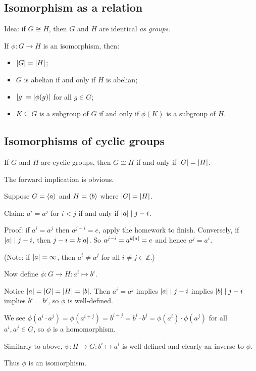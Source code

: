 \documentclass[12pt,letterpaper]{report}
\begin{document}
\pagebreak
\subsection{Isomorphism as a relation}

Idea: if $G \cong H$, then $G$ and $H$ are identical \emph{as groups}.

If $\phi \colon G \to H$ is an isomorphism, then:
\begin{itemize}
  \item $\lvert G\rvert = \lvert H\rvert$;
  \item $G$ is abelian if and only if $H$ is abelian;
  \item $\lvert g\rvert = \lvert\phi(g)\rvert$ for all $g \in G$;
  \item $K \subseteq G$ is a subgroup of $G$ if and only if $\phi(K)$ is a subgroup of $H$.
\end{itemize}

\pagebreak
\subsection{Isomorphisms of cyclic groups}

\begin{prop}{}{}
  If $G$ and $H$ are cyclic groups, then $G \cong H$ if and only if $\lvert G\rvert = \lvert H\rvert$.
\end{prop}

\begin{thmproof}
  The forward implication is obvious.

  Suppose $G = \langle a\rangle$ and $H = \langle b\rangle$ where $\lvert G\rvert = \lvert H\rvert$.

  Claim: $a^i = a^j$ for $i < j$ if and only if $\lvert a\rvert \mid j - i$.

  Proof: if $a^i = a^j$ then $a^{j - i} = e$, apply the homework to finish.
  Conversely, if $\lvert a\rvert \mid j - i$, then $j - i = k\lvert a\rvert$.
  So $a^{j - i} = a^{k\lvert a\rvert} = e$ and hence $a^j = a^i$.

  (Note: if $\lvert a\rvert = \infty$, then $a^i \neq a^j$ for all $i \neq j \in \mathbb{Z}$.)

  Now define $\phi \colon G \to H : a^i \mapsto b^i$.

  Notice $\lvert a\rvert = \lvert G\rvert = \lvert H\rvert = \lvert b\rvert$.
  Then $a^i = a^j$ implies $\lvert a\rvert \mid j - i$ implies $\lvert b\rvert \mid j - i$ implies $b^i = b^j$, so
  $\phi$ is well-defined.

  We see $\phi(a^i \cdot a^j) = \phi(a^{i + j}) = b^{i + j} = b^i \cdot b^j
    = \phi(a^i) \cdot \phi(a^j)$ for all $a^i, a^j \in G$, so $\phi$ is a homomorphism.

  Similarly to above, $\psi \colon H \to G : b^i \mapsto a^i$ is well-defined and clearly an
  inverse to $\phi$.

  Thus $\phi$ is an isomorphism.
\end{thmproof}
\end{document}

